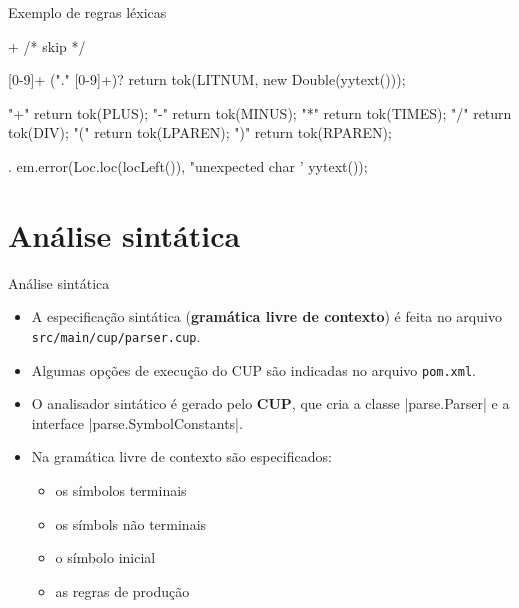 \documentclass[smaller]{beamer}
\begin{document}
\begin{frame}{Exemplo de regras léxicas}
\begin{pygmented}[lang=text]
[ \t\f\n\r]+           { /* skip */ }

[0-9]+ ("." [0-9]+)?   { return tok(LITNUM, new Double(yytext())); }

"+"                    { return tok(PLUS); }
"-"                    { return tok(MINUS); }
"*"                    { return tok(TIMES); }
"/"                    { return tok(DIV); }
"("                    { return tok(LPAREN); }
")"                    { return tok(RPAREN); }

.                      { em.error(Loc.loc(locLeft()),
                                  "unexpected char '%
                                  yytext()); }
\end{pygmented}
\end{frame}


\section{Análise sintática}

\begin{frame}{Análise sintática}
  \begin{itemize}
    \item A especificação sintática (\textbf{gramática livre de
      contexto}) é feita no arquivo
    \alert{\texttt{src/main/cup/parser.cup}}.
    \item Algumas opções de execução do CUP são indicadas no arquivo
    \alert{\texttt{pom.xml}}.
    \item O analisador sintático é gerado pelo \textbf{CUP}, que cria
    a classe \pyginline|parse.Parser| e a interface
    \pyginline|parse.SymbolConstants|.
    \item Na gramática livre de contexto são especificados:
    \begin{itemize}
      \item os símbolos terminais
      \item os símbols não terminais
      \item o símbolo inicial
      \item as regras de produção
    \end{itemize}
  \end{itemize}
\end{frame}
\end{document}
